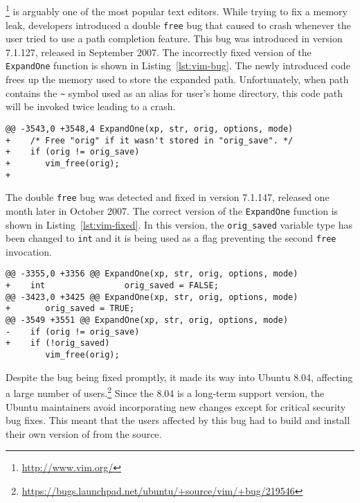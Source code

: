 \subsection{\vim}

\vim\footnote{\url{http://www.vim.org/}} is arguably one of the most popular
text editors. While trying to fix a memory leak, \vim developers introduced a
double \lstinline`free` bug that caused \vim to crash whenever the user tried to
use a path completion feature. This bug was introduced in version 7.1.127,
released in September 2007. The incorrectly fixed version of the
\lstinline`ExpandOne` function is shown in Listing~\ref{lst:vim-bug}. The newly
introduced code frees up the memory used to store the expanded path.
Unfortunately, when path contains the \lstinline`~` symbol used as an alias for
user's home directory, this code path will be invoked twice leading to a crash.

\begin{lstlisting}[alsolanguage=diff,numbers=none,label=lst:vim-bug,caption={First (incorrect) fix of \lstinline`ExpandOne` function in \vim.}]
@@ -3543,0 +3548,4 ExpandOne(xp, str, orig, options, mode)
+    /* Free "orig" if it wasn't stored in "orig_save". */
+    if (orig != orig_save)
+       vim_free(orig);
+
\end{lstlisting}

The double \lstinline`free` bug was detected and fixed in version 7.1.147, released
one month later in October 2007. The correct version of the \lstinline`ExpandOne`
function is shown in Listing~\ref{lst:vim-fixed}. In this version, the
\lstinline`orig_saved` variable type has been changed to \lstinline`int` and it is
being used as a flag preventing the second \lstinline`free` invocation.

\begin{lstlisting}[alsolanguage=diff,numbers=none,label=lst:vim-fixed,caption={Second (correct) fix \lstinline`ExpandOne` function in \vim.}]
@@ -3355,0 +3356 @@ ExpandOne(xp, str, orig, options, mode)
+    int                orig_saved = FALSE;
@@ -3423,0 +3425 @@ ExpandOne(xp, str, orig, options, mode)
+       orig_saved = TRUE;
@@ -3549 +3551 @@ ExpandOne(xp, str, orig, options, mode)
-    if (orig != orig_save)
+    if (!orig_saved)
        vim_free(orig);
\end{lstlisting}

Despite the bug being fixed promptly, it made its way into Ubuntu 8.04,
affecting a large number of
users.\footnote{\url{https://bugs.launchpad.net/ubuntu/+source/vim/+bug/219546}}
Since the 8.04 is a long-term support version, the Ubuntu maintainers avoid
incorporating new changes except for critical security bug fixes. This meant
that the \vim users affected by this bug had to build and install their own
version of \vim from the source.

